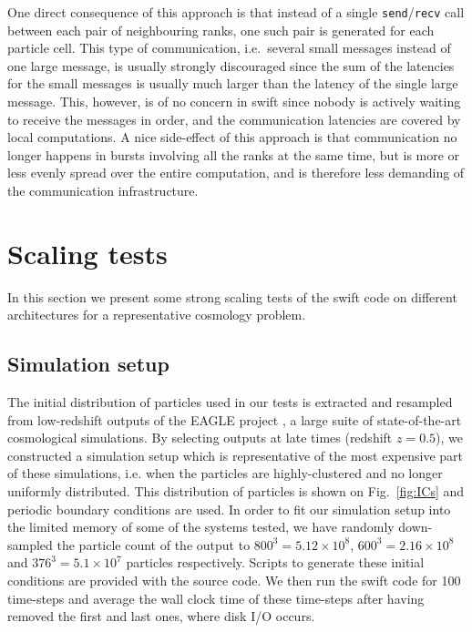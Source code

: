 \documentclass{sig-alternate-05-2015}
\newcommand{\swift}{{\sc swift}\xspace}
\begin{document}
One direct consequence of this approach is that instead of a single
{\tt send}/{\tt recv} call between each pair of neighbouring ranks,
one such pair is generated for each particle cell.
This type of communication, i.e.~several small messages instead of
one large message, is usually strongly discouraged since the sum of
the latencies for the small messages is usually much larger than
the latency of the single large message.
This, however, is of no concern in \swift since nobody is actively
waiting to receive the messages in order, and the communication
latencies are covered by local computations.
A nice side-effect of this approach is that communication no longer
happens in bursts involving all the ranks at the same time, but
is more or less evenly spread over the entire computation, and is
therefore less demanding of the communication infrastructure.




\section{Scaling tests}

In this section we present some strong scaling tests of the \swift code on different
architectures for a representative cosmology problem.

\subsection{Simulation setup}

The initial distribution of particles used in our tests is extracted and
resampled from low-redshift outputs of the EAGLE project \cite{Schaye2015}, a
large suite of state-of-the-art cosmological simulations. By selecting outputs
at late times (redshift $z=0.5$), we constructed a simulation setup which is
representative of the most expensive part of these simulations, i.e. when the
particles are highly-clustered and no longer uniformly distributed. This
distribution of particles is shown on Fig.~\ref{fig:ICs} and periodic boundary
conditions are used. In order to fit our simulation setup into the limited
memory of some of the systems tested, we have randomly down-sampled the particle
count of the output to $800^3=5.12\times10^8$, $600^3=2.16\times10^8$ and
$376^3=5.1\times10^7$ particles respectively. Scripts to generate these initial
conditions are provided with the source code. We then run the \swift code for
100 time-steps and average the wall clock time of these time-steps after having
removed the first and last ones, where disk I/O occurs.
\end{document}
